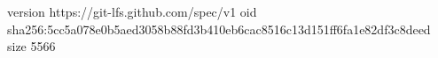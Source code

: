 version https://git-lfs.github.com/spec/v1
oid sha256:5cc5a078e0b5aed3058b88fd3b410eb6cac8516c13d151ff6fa1e82df3c8deed
size 5566
